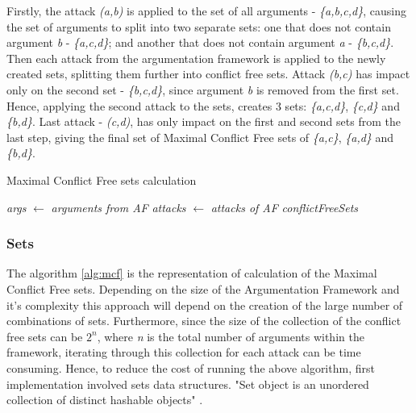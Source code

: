 Firstly, the attack \textit{(a,b)} is applied to the set of all arguments - \textit{\{a,b,c,d\}}, causing the set of arguments to split into two separate sets: one that does not contain argument \textit{b} - \textit{\{a,c,d\}}; and another that does not contain argument \textit{a} - \textit{\{b,c,d\}}. Then each attack from the argumentation framework is applied to the newly created sets, splitting them further into conflict free sets. Attack \textit{(b,c)} has impact only on the second set - \textit{\{b,c,d\}}, since argument \textit{b} is removed from the first set. Hence, applying the second attack to the sets, creates 3 sets: \textit{\{a,c,d\}}, \textit{\{c,d\}} and \textit{\{b,d\}}. Last attack - \textit{(c,d)}, has only impact on the first and second sets from the last step, giving the final set of Maximal Conflict Free sets of \textit{\{a,c\}}, \textit{\{a,d\}} and \textit{\{b,d\}}.

\begin{algorithm}
	\caption{Maximal Conflict Free sets calculation}\label{mcfPseudocode}
	\nl \textit{args} $\gets$ \textit{arguments from AF}\;
	\nl \textit{attacks} $\gets$ \textit{attacks of AF}\;
	\nl \textit{conflictFreeSets} \;
	\nl{}
	{
	}
	\label{alg:mcf}
\end{algorithm}

\subsubsection{Sets}

The algorithm \ref{alg:mcf} is the representation of calculation of the Maximal Conflict Free sets. Depending on the size of the Argumentation Framework and it's complexity this approach will depend on the creation of the large number of combinations of sets. Furthermore, since the size of the collection of the conflict free sets can be $2^n$, where \textit{n} is the total number of arguments within the framework, iterating through this collection for each attack can be time consuming. Hence, to reduce the cost of running the above algorithm, first implementation involved sets data structures. "Set object is an unordered collection of distinct hashable objects" \citep{python_sets}.

